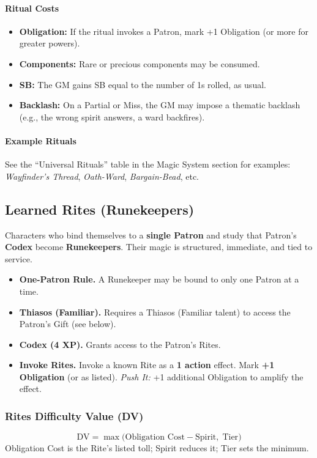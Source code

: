 \paragraph{Ritual Costs}
\begin{itemize}
  \item \textbf{Obligation:} If the ritual invokes a Patron, mark +1 Obligation (or more for greater powers).
  \item \textbf{Components:} Rare or precious components may be consumed.
  \item \textbf{SB:} The GM gains SB equal to the number of 1s rolled, as usual.
  \item \textbf{Backlash:} On a Partial or Miss, the GM may impose a thematic backlash (e.g., the wrong spirit answers, a ward backfires).
\end{itemize}

\paragraph{Example Rituals}
See the ``Universal Rituals'' table in the Magic System section for examples: \textit{Wayfinder's Thread}, \textit{Oath-Ward}, \textit{Bargain-Bead}, etc.

\subsection{Learned Rites (Runekeepers)}
\label{subsec:runekeepers}

Characters who bind themselves to a \textbf{single Patron} and study that Patron's \textbf{Codex} become \textbf{Runekeepers}. Their magic is structured, immediate, and tied to service.

\begin{itemize}
  \item \textbf{One-Patron Rule.} A Runekeeper may be bound to only one Patron at a time.
  \item \textbf{Thiasos (Familiar).} Requires a Thiasos (Familiar talent) to access the Patron's Gift (see below).
  \item \textbf{Codex (4 XP).} Grants access to the Patron's Rites.
  \item \textbf{Invoke Rites.} Invoke a known Rite as a \textbf{1 action} effect. Mark \textbf{+1 Obligation} (or as listed). \emph{Push It:} +1 additional Obligation to amplify the effect.
\end{itemize}

\subsubsection{Rites Difficulty Value (DV)}
\[
\text{DV} = \max\!\big(\text{Obligation Cost} - \text{Spirit},\; \text{Tier}\big)
\]
Obligation Cost is the Rite's listed toll; Spirit reduces it; Tier sets the minimum.

